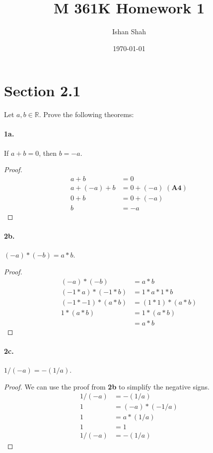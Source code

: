 \documentclass[12pt]{article}
\newcommand\R{\mathbb{R}}
\theoremstyle{remark}
\begin{document}
\title{M 361K Homework 1}
\author{Ishan Shah}
\date{\today}
\maketitle

\section*{Section 2.1}
Let $a, b \in \R$. Prove the following theorems:

\paragraph{1a.} If $a + b = 0$, then $b = -a$.
\begin{proof}
    \begin{align*}
        a + b &= 0 \\
        a + (-a) + b &= 0 + (-a) \mathbf{\;(A4)} \\
        0 + b &= 0 + (-a) \\
        b &= -a
    \end{align*}
\end{proof}

\paragraph{2b.} $(-a) * (-b) = a * b$. 
\begin{proof}
    \begin{align*}
        (-a) * (-b) &= a * b \\
        (-1 * a) * (-1 * b) &= 1 * a * 1 * b \\
        (-1 * -1) * (a * b) &= (1 * 1) * (a * b) \\
        1 * (a * b) &= 1 * (a * b) \\
        &= a * b
    \end{align*}
\end{proof}

\paragraph{2c.} $1 / (-a) = -(1 / a)$. 
\begin{proof}
    We can use the proof from \textbf{2b} to simplify the negative signs.
    \begin{align*}
        1/(-a) &= -(1/a) \\
        1 &= (-a) * (-1/a) \\
        1 &= a * (1/a) \\
        1 &= 1 \\
        1/(-a) &= -(1/a)
    \end{align*}
\end{proof}
\end{document}
